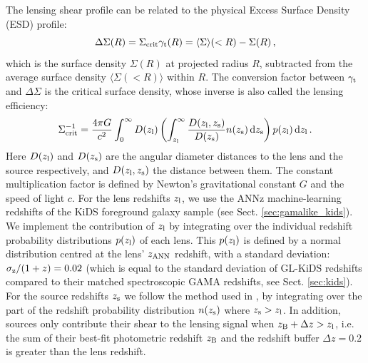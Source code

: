 \documentclass[usenatbib]{mnras}
\newcommand*{\meanb}[1]{\langle{#1}\rangle}
\newcommand{\un}[1]{_{\rm #1}}
\begin{document}
The lensing shear profile can be related to the physical Excess Surface Density (ESD) profile:
\begin{equation}
	\Delta \Sigma (R) = \Sigma\un{crit} \gamma\un{t}(R) = \meanb{\Sigma}(<R) - \Sigma(R) \, ,
	\label{eq:deltasigma}
\end{equation}
which is the surface density $\Sigma(R)$ at projected radius $R$, subtracted from the average surface density $\meanb{\Sigma(<R)}$ within $R$. The conversion factor between $\gamma\un{t}$ and $\Delta\Sigma$ is the critical surface density, whose inverse is also called the lensing efficiency:
\begin{equation}
	\Sigma\un{crit}^{-1} = \frac{4\pi G}{c^2} \int_{0}^{\infty} D(z\un{l}) \left( \int_{z\un{l}}^{\infty}  \frac{D(z\un{l}, z\un{s})}{D(z\un{s})} n(z\un{s}) \, {\rm d} z\un{s} \right) p(z\un{l}) \, {\rm d} z\un{l} \, .
	\label{eq:sigmacrit}
\end{equation}
Here $D(z\un{l})$ and $D(z\un{s})$ are the angular diameter distances to the lens and the source respectively, and $D(z\un{l}, z\un{s})$ the distance between them. The constant multiplication factor is defined by Newton's gravitational constant $G$ and the speed of light $c$. For the lens redshifts $z\un{l}$, we use the ANNz machine-learning redshifts of the KiDS foreground galaxy sample (see Sect. \ref{sec:gamalike_kids}). We implement the contribution of $z\un{l}$ by integrating over the individual redshift probability distributions $p(z\un{l})$ of each lens. This $p(z\un{l})$ is defined by a normal distribution centred at the lens' $z\un{ANN}$ redshift, with a standard deviation: $\sigma\un{z}/(1+z) = 0.02$ (which is equal to the standard deviation of GL-KiDS redshifts compared to their matched spectroscopic GAMA redshifts, see Sect. \ref{sec:kids}). For the source redshifts $z\un{s}$ we follow the method used in \cite{dvornik2018}, by integrating over the part of the redshift probability distribution $n(z\un{s})$ where $z\un{s}>z\un{l}$. In addition, sources only contribute their shear to the lensing signal when $z\un{B}+\Delta z > z\un{l}$, i.e. the sum of their best-fit photometric redshift $z\un{B}$ and the redshift buffer $\Delta z=0.2$ is greater than the lens redshift.
\end{document}
